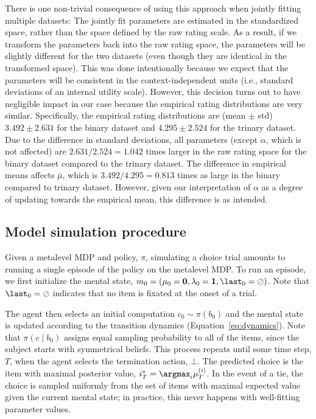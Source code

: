 There is one non-trivial consequence of using this approach when jointly fitting multiple datasets: The jointly fit parameters are estimated in the standardized space, rather than the space defined by the raw rating scale. As a result, if we transform the parameters back into the raw rating space, the parameters will be slightly different for the two datasets (even though they are identical in the transformed space). This was done intentionally because we expect that the parameters will be consistent in the context-independent units (i.e., standard deviations of an internal utility scale). However, this decision turns out to have negligible impact in our case because the empirical rating distributions are very similar. Specifically, the empirical rating distributions are (mean $\pm$ std) $3.492 \pm 2.631$ for the binary dataset and $4.295 \pm 2.524$ for the trinary dataset. Due to the difference in standard deviations, all parameters (except $\alpha$, which is not affected) are $2.631 / 2.524 = 1.042$ times larger in the raw rating space for the binary dataset compared to the trinary dataset. The difference in empirical means affects $\bar{\mu}$, which is $3.492 / 4.295 = 0.813$ times as large in the binary compared to trinary dataset. However, given our interpretation of $\alpha$ as a degree of updating towards the empirical mean, this difference is as intended.

\subsection{Model simulation procedure}

Given a metalevel MDP and policy, $\pi$, simulating a choice trial amounts to running a single episode of the policy on the metalevel MDP. To run an episode, we first initialize the mental state, $m_0 = (\mathbf{\mu}_0 = \mathbf{0}, \mathbf{\lambda}_0 = \mathbf{1}, \last_0 = \oslash)$. Note that $\last_0 = \oslash$ indicates that no item is fixated at the onset of a trial.

The agent then selects an initial computation $c_{0}\sim\pi(b_{0})$ and the mental state is updated according to the transition dynamics (Equation~\ref{eq:dynamics}). Note that $\pi(c \mid b_{0})$ assigns equal sampling probability to all of the items, since the subject starts with symmetrical beliefs. This process repeats until some time step, $T$, when the agent selects the termination action, $\bot$. The predicted choice is the item with maximal posterior value, $i^*_T = \argmax_{i} \mu_T^{(i)}$. In the event of a tie, the choice is sampled uniformly from the set of items with maximal expected value given the current mental state; in practice, this never happens with well-fitting parameter values.

